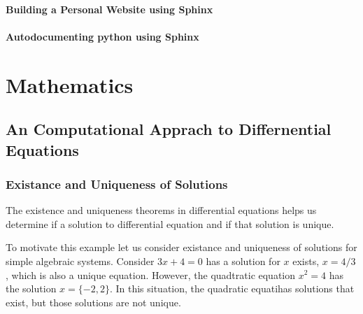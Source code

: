 \documentclass[letterpaper,10pt,english]{sphinxmanual}
\begin{document}
\paragraph{Building a Personal Website using Sphinx}
\label{\detokenize{sphinx_tutorial/index:building-a-personal-website-using-sphinx}}


\paragraph{Autodocumenting python using Sphinx}
\label{\detokenize{sphinx_tutorial/index:autodocumenting-python-using-sphinx}}

\section{Mathematics}
\label{\detokenize{math/index:mathematics}}\label{\detokenize{math/index::doc}}

\subsection{An Computational Apprach to Differnential Equations}
\label{\detokenize{math/differential_equations:an-computational-apprach-to-differnential-equations}}\label{\detokenize{math/differential_equations::doc}}

\subsubsection{Existance and Uniqueness of Solutions}
\label{\detokenize{math/differential_equations:existance-and-uniqueness-of-solutions}}
The existence and uniqueness theorems in differential equations helps us determine if a solution to differential equation and if that solution is unique.

To motivate this example let us consider existance and uniqueness of solutions for simple algebraic systems.  Consider \(3x+4=0\) has a solution for \(x\) exists, \(x=4/3\), which is also a unique equation.  However, the quadtratic equation \(x^2=4\) has the solution \(x=\{-2,2\}\).  In this situation, the quadratic equatihas solutions that exist, but those solutions are not unique.
\end{document}
